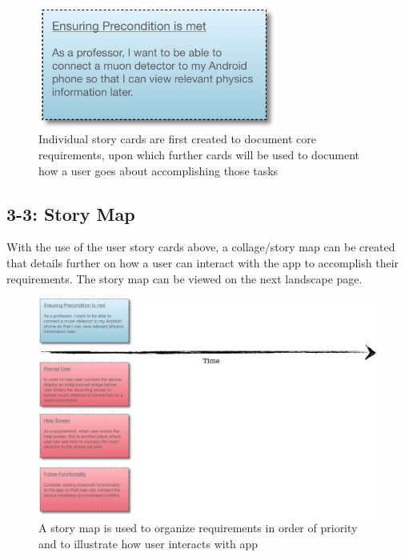 \documentclass[11pt,a4paper]{article}
\begin{document}
\newpage


\begin{figure}[h]
  \centering
  
      \includegraphics[width=0.7\textwidth]{storycard1.png}
      \caption{Individual story cards are first created to document core requirements, upon which further cards will be used to document how a user goes about accomplishing those tasks}
  
\end{figure}


\subsection*{3-3: Story Map}

With the use of the user story cards above, a collage/story map can be created that details further on how a user can interact with the app to accomplish their requirements. The story map can be viewed on the next landscape page. 

\newpage
\begin{landscape}
\begin{figure}[h]
  \centering
  \vspace*{-2cm} \hspace*{-0.5cm}
      \includegraphics[width=2.0\textwidth]{storymap.png}
      \caption{A story map is used to organize requirements in order of priority and to illustrate how user interacts with app}
  
\end{figure}
\end{landscape}
\end{document}
